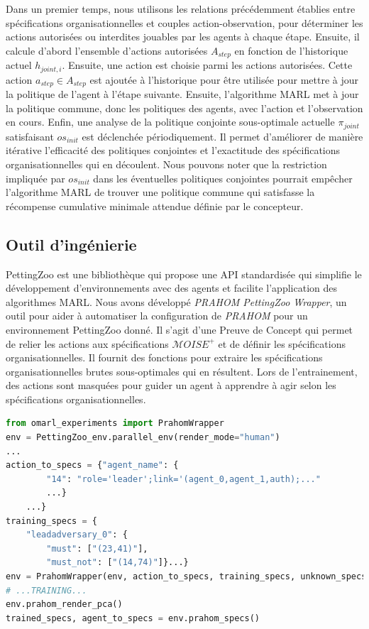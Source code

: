 \documentclass[contribution]{jfsma}
\newcounter{relation}
\begin{document}
Dans un premier temps, nous utilisons les relations précédemment établies entre spécifications organisationnelles et couples action-observation, pour déterminer les actions autorisées ou interdites jouables par les agents à chaque étape.
Ensuite, il calcule d'abord l'ensemble d'actions autorisées $A_{step}$ en fonction de l'historique actuel $h_{joint,i}$. Ensuite, une action est choisie parmi les actions autorisées. Cette action $a_{step} \in A_{step}$ est ajoutée à l'historique pour être utilisée pour mettre à jour la politique de l'agent à l'étape suivante. Ensuite, l'algorithme MARL met à jour la politique commune, donc les politiques des agents, avec l'action et l'observation en cours.
Enfin, une analyse de la politique conjointe sous-optimale actuelle $\pi_{joint}$ satisfaisant $os_{init}$ est déclenchée périodiquement. Il permet d’améliorer de manière itérative l’efficacité des politiques conjointes et l’exactitude des spécifications organisationnelles qui en découlent.
Nous pouvons noter que la restriction impliquée par $os_{init}$ dans les éventuelles politiques conjointes pourrait empêcher l'algorithme MARL de trouver une politique commune qui satisfasse la récompense cumulative minimale attendue définie par le concepteur.

\subsection{Outil d'ingénierie}

PettingZoo est une bibliothèque qui propose une API standardisée qui simplifie le développement d'environnements avec des agents et facilite l'application des algorithmes MARL.
Nous avons développé \emph{PRAHOM PettingZoo Wrapper}\label{PettingZoo-wrapper}, un outil pour aider à automatiser la configuration de \emph{PRAHOM} pour un environnement PettingZoo donné.
Il s'agit d'une Preuve de Concept qui permet de relier les actions aux spécifications $\mathcal{M}OISE^+$ et de définir les spécifications organisationnelles. Il fournit des fonctions pour extraire les spécifications organisationnelles brutes sous-optimales qui en résultent. Lors de l'entrainement, des actions sont masquées pour guider un agent à apprendre à agir selon les spécifications organisationnelles.

\begin{lstlisting}[language=Python, caption=PRAHOM PettingZoo Wrapper basic use, label={lst:wrapper_basic_use}]
from omarl_experiments import PrahomWrapper
env = PettingZoo_env.parallel_env(render_mode="human")
...
action_to_specs = {"agent_name": {
        "14": "role='leader';link='(agent_0,agent_1,auth);..."
        ...}    
    ...}
training_specs = {
    "leadadversary_0": {
        "must": ["(23,41)"],
        "must_not": ["(14,74)"]}...}
env = PrahomWrapper(env, action_to_specs, training_specs, unknown_specs_inference=True, pca_output=True)
# ...TRAINING...
env.prahom_render_pca()
trained_specs, agent_to_specs = env.prahom_specs()
\end{lstlisting}
\end{document}
